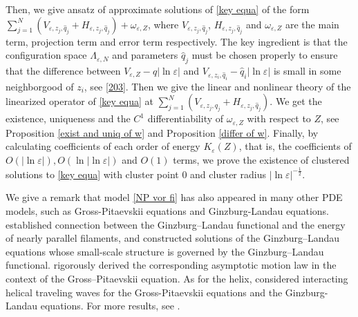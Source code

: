 \documentclass[12pt,reqno]{amsart}
\numberwithin{equation}{section}
\theoremstyle{definition}
\theoremstyle{remark}
\begin{document}
 Then, we   give ansatz of approximate solutions of \eqref{key equa} of the form $ \sum_{j=1}^N\left (V_{\varepsilon, z_j, \hat{q}_j}+H_{\varepsilon, z_j, \hat{q}_j}\right )+\omega_{\varepsilon,Z} $,  where $ V_{\varepsilon, z_j, \hat{q}_j} $, $ H_{\varepsilon, z_j, \hat{q}_j} $ and $ \omega_{\varepsilon,Z}$ are the main term,  projection term and  error term respectively. The key ingredient is that the configuration space  $ \Lambda_{\varepsilon, N} $ and   parameters $ \hat{q}_j $ must be chosen properly   %
to ensure that %
 the difference between $ V_{\varepsilon,Z}-q|\ln\varepsilon| $ and $V_{\varepsilon, z_i, \hat{q}_{i}}-\hat{q}_{i}|\ln\varepsilon| $ is small in some neighborgood of $ z_i $, see \eqref{203}. Then we give the linear and nonlinear theory of the linearized operator of \eqref{key equa} at $ \sum_{j=1}^N\left (V_{\varepsilon, z_j, \hat{q}_j}+H_{\varepsilon, z_j, \hat{q}_j}\right ) $.  %
We get the existence, uniqueness  and the $ C^1 $ differentiability of $ \omega_{\varepsilon,Z}  $ with respect to $ Z $, see  Proposition \ref{exist and uniq of w} and  
 Proposition \ref{differ of w}. Finally, by calculating   coefficients of each order of energy $ K_\varepsilon(Z) $, that is, the coefficients of $ O(|\ln\varepsilon|), O(\ln|\ln\varepsilon|) $ and $ O(1) $ terms, %
we prove the existence of   clustered solutions to \eqref{key equa} with cluster point $ 0 $ and cluster radius $  |\ln\varepsilon|^{-\frac{1}{2}} $.

We give a remark that model \eqref{NP vor fi} has also appeared in many other PDE models, such as Gross-Pitaevskii equations and Ginzburg-Landau equations. \cite{CJ1} established connection between the Ginzburg–Landau functional and the energy of nearly parallel filaments, and constructed  solutions of the Ginzburg–Landau equations  whose small-scale structure is governed by the Ginzburg–Landau functional. \cite{JS2} rigorously
derived the corresponding asymptotic motion law in the context of the Gross–Pitaevskii
equation.  As for the helix,  \cite{DDMR,DDMR2} considered interacting helical traveling waves
for the Gross-Pitaevskii equations and the Ginzburg-Landau equations. For more results, see \cite{Cho, WY}.
\end{document}
